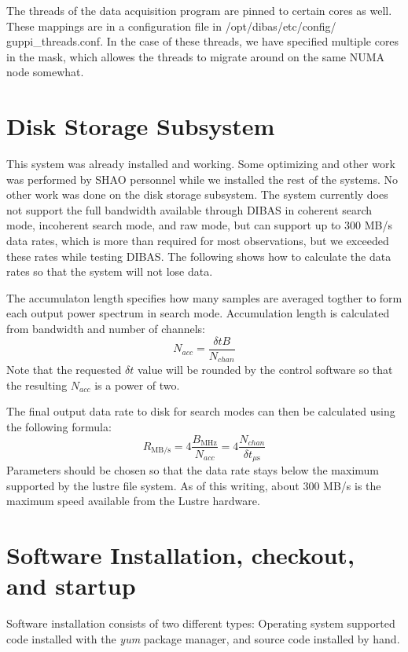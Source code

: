\documentclass[11pt]{article}
\begin{document}
The threads of the data acquisition program are pinned to certain
cores as well.  These mappings are in a configuration file in
/opt/dibas/etc/config/ guppi\_threads.conf.  In the case of these
threads, we have specified multiple cores in the mask, which allowes
the threads to migrate around on the same NUMA node somewhat.

\section{Disk Storage Subsystem}

This system was already installed and working.  Some optimizing and
other work was performed by SHAO personnel while we installed the rest
of the systems.  No other work was done on the disk storage subsystem.
The system currently does not support the full bandwidth available
through DIBAS in coherent search mode, incoherent search mode, and raw
mode, but can support up to 300 MB/s data rates, which is more than
required for most observations, but we exceeded these rates while
testing DIBAS.  The following shows how to calculate the data rates so
that the system will not lose data.

The accumulaton length specifies how many samples are averaged togther
to form each output power spectrum in search mode.  Accumulation length
is calculated from bandwidth and number of channels:
\begin{equation}
        N_{acc} = \frac{\delta t B}{N_{chan}}
\end{equation}
Note that the requested $\delta t$ value will be rounded by the control
software so that the resulting $N_{acc}$ is a power of two.

The final output data rate to disk for search modes can then be
calculated using the following formula:
\begin{equation}
        R_{\mathrm{MB/s}} = 4 \frac{B_{\mathrm{MHz}}}{N_{acc}}
        = 4 \frac{N_{chan}}{\delta t_{\mu\mathrm{s}}}
\end{equation}
Parameters should be chosen so that the data rate stays below the
maximum supported by the lustre file system.  As of this writing,
about 300 MB/s is the maximum speed available from the Lustre
hardware.

\section{Software Installation, checkout, and startup}
Software installation consists of two different types: Operating
system supported code installed with the \emph{yum} package manager,
and source code installed by hand.
\end{document}
